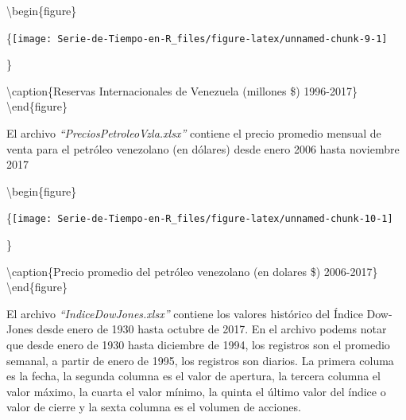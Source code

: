 \documentclass[12pt,]{krantz}
\makeatletter
\newenvironment{Shaded}{\begin{snugshade}}{\end{snugshade}}
\newcommand{\KeywordTok}[1]{\textcolor[rgb]{0.13,0.29,0.53}{\textbf{#1}}}
\newcommand{\DataTypeTok}[1]{\textcolor[rgb]{0.13,0.29,0.53}{#1}}
\newcommand{\DecValTok}[1]{\textcolor[rgb]{0.00,0.00,0.81}{#1}}
\newcommand{\StringTok}[1]{\textcolor[rgb]{0.31,0.60,0.02}{#1}}
\newcommand{\NormalTok}[1]{#1}
\newenvironment{kframe}{%
\medskip{}
\setlength{\fboxsep}{.8em}
 \def\at@end@of@kframe{}%
 \ifinner\ifhmode%
  \def\at@end@of@kframe{\end{minipage}}%
  \begin{minipage}{\columnwidth}%
 \fi\fi%
 \def\FrameCommand##1{\hskip\@totalleftmargin \hskip-\fboxsep
 \colorbox{shadecolor}{##1}\hskip-\fboxsep
     \hskip-\linewidth \hskip-\@totalleftmargin \hskip\columnwidth}%
 \MakeFramed {\advance\hsize-\width
   \@totalleftmargin\z@ \linewidth\hsize
   \@setminipage}}%
 {\par\unskip\endMakeFramed%
 \at@end@of@kframe}
\renewenvironment{Shaded}{\begin{kframe}}{\end{kframe}}
\theoremstyle{definition}
\theoremstyle{definition}
\theoremstyle{definition}
\theoremstyle{remark}
\let\BeginKnitrBlock\begin \let\EndKnitrBlock\end
\makeatother
\begin{document}
\textbackslash{}begin\{figure\}

\{\centering \texttt{[image: Serie-de-Tiempo-en-R\_files/figure-latex/unnamed-chunk-9-1]}

\}

\textbackslash{}caption\{Reservas Internacionales de Venezuela (millones
\$) 1996-2017\}\label{fig:unnamed-chunk-9} \textbackslash{}end\{figure\}

\BeginKnitrBlock{example}
\protect\hypertarget{exm:precio-petroleo}{}{\label{exm:precio-petroleo} }El
archivo \emph{``PreciosPetroleoVzla.xlsx''} contiene el precio promedio
mensual de venta para el petróleo venezolano (en dólares) desde enero
2006 hasta noviembre 2017
\EndKnitrBlock{example}

\begin{Shaded}
\end{Shaded}

\textbackslash{}begin\{figure\}

\{\centering \texttt{[image: Serie-de-Tiempo-en-R\_files/figure-latex/unnamed-chunk-10-1]}

\}

\textbackslash{}caption\{Precio promedio del petróleo venezolano (en
dolares \$) 2006-2017\}\label{fig:unnamed-chunk-10}
\textbackslash{}end\{figure\}

\BeginKnitrBlock{example}
\protect\hypertarget{exm:indice-dow-jones}{}{\label{exm:indice-dow-jones}
}El archivo \emph{``IndiceDowJones.xlsx''} contiene los valores
histórico del Índice Dow-Jones desde enero de 1930 hasta octubre de
2017. En el archivo podems notar que desde enero de 1930 hasta diciembre
de 1994, los registros son el promedio semanal, a partir de enero de
1995, los registros son diarios. La primera columa es la fecha, la
segunda columna es el valor de apertura, la tercera columna el valor
máximo, la cuarta el valor mínimo, la quinta el último valor del índice
o valor de cierre y la sexta columna es el volumen de acciones.
\EndKnitrBlock{example}
\end{document}
